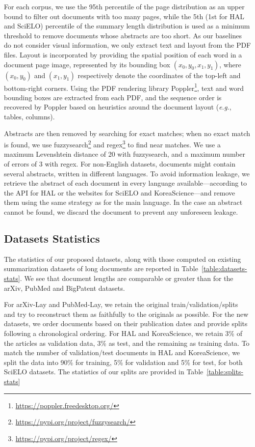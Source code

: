 For each corpus, we use the 95th percentile of the page distribution as an upper bound to filter out documents with too many pages, while the 5th (1st for HAL and SciELO) percentile of the summary length distribution is used as a minimum threshold to remove documents whose abstracts are too short. As our baselines do not consider visual information, we only extract text and layout from the PDF files. Layout is incorporated by providing the spatial position of each word in a document page image, represented by its bounding box $(x_0, y_0, x_1, y_1)$, where $(x_0, y_0)$ and $(x_1, y_1)$ respectively denote the coordinates of the top-left and bottom-right corners. Using the PDF rendering library Poppler\footnote{ \url{https://poppler.freedesktop.org/}}, text and word bounding boxes are extracted from each PDF, and the sequence order is recovered by Poppler based on heuristics around the document layout (\textit{e.g.}, tables, columns). 

Abstracts are then removed by searching for exact matches; when no exact match is found, we use fuzzysearch\footnote{ \url{https://pypi.org/project/fuzzysearch/}} and regex\footnote{ \url{https://pypi.org/project/regex/}} to find near matches. We use a maximum Levenshtein distance of 20 with fuzzysearch, and a maximum number of errors of 3 with regex. For non-English datasets, documents might contain several abstracts, written in different languages. To avoid information leakage, we retrieve the abstract of each document in every language available—according to the API for HAL or the websites for SciELO and KoreaScience—and remove them using the same strategy as for the main language. In the case an abstract cannot be found, we discard the document to prevent any unforeseen leakage. 

\subsection{Datasets Statistics}

The statistics of our proposed datasets, along with those computed on existing summarization datasets of long documents \citep{cohan2018discourse, sharma2019bigpatent} are reported in Table~\ref{table:datasets-stats}. We see that document lengths are comparable or greater than for the arXiv, PubMed and BigPatent datasets.  

For arXiv-Lay and PubMed-Lay, we retain the original train/validation/splits and try to reconstruct them as faithfully to the originals as possible. For the new datasets, we order documents based on their publication dates and provide splits following a chronological ordering. For HAL and KoreaScience, we retain 3\% of the articles as validation data, 3\% as test, and the remaining as training data. To match the number of validation/test documents in HAL and KoreaScience, we split the data into 90\% for training, 5\% for validation and 5\% for test, for both SciELO datasets. The statistics of our splits are provided in Table~\ref{table:splits-stats}

